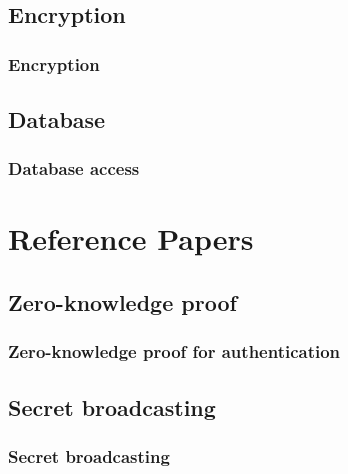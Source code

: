 \documentclass{beamer}
\begin{document}
\subsection{Encryption}

\begin{frame}
\frametitle{Encryption}
\end{frame}

\subsection{Database}

\begin{frame}
\frametitle{Database access}
\end{frame}

\section{Reference Papers}


\subsection{Zero-knowledge proof}

\begin{frame}
\frametitle{Zero-knowledge proof for authentication}
\end{frame}

\subsection{Secret broadcasting}

\begin{frame}
\frametitle{Secret broadcasting}
\end{frame}
\end{document}
